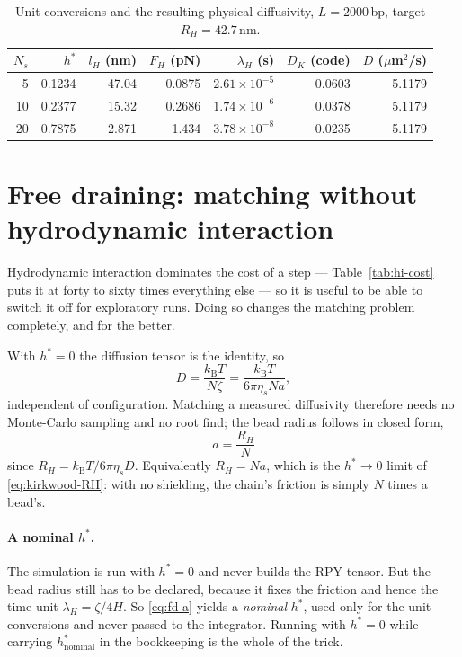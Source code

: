 \documentclass[11pt,a4paper]{report}
\newcommand{\kB}{k_\mathrm{B}}
\begin{document}
\begin{table}[ht]
\centering
\caption{Unit conversions and the resulting physical diffusivity, $L = 2000$\,bp,
target $R_H = 42.7$\,nm.}
\label{tab:real-units}
\begin{tabular}{@{}rrrrrrr@{}}
\toprule
$N_s$ & $h^{*}$ & $l_H$ (nm) & $F_H$ (pN) & $\lambda_H$ (s) & $D_K$ (code) & $D$ ($\mu$m$^2$/s) \\
\midrule
5  & 0.1234 & 47.04 & 0.0875 & $2.61\times10^{-5}$ & 0.0603 & 5.1179 \\
10 & 0.2377 & 15.32 & 0.2686 & $1.74\times10^{-6}$ & 0.0378 & 5.1179 \\
20 & 0.7875 & 2.871 & 1.434  & $3.78\times10^{-8}$ & 0.0235 & 5.1179 \\
\bottomrule
\end{tabular}
\end{table}



\section{Free draining: matching without hydrodynamic interaction}
\label{sec:free-draining}

Hydrodynamic interaction dominates the cost of a step --- Table~\ref{tab:hi-cost}
puts it at forty to sixty times everything else --- so it is useful to be able to
switch it off for exploratory runs. Doing so changes the matching problem
completely, and for the better.

With $h^{*} = 0$ the diffusion tensor is the identity, so
\begin{equation}
  D = \frac{\kB T}{N\zeta} = \frac{\kB T}{6\pi\eta_s N a},
\end{equation}
independent of configuration. Matching a measured diffusivity therefore needs no
Monte-Carlo sampling and no root find; the bead radius follows in closed form,
\begin{equation}
  \boxed{\; a = \frac{R_H}{N} \;}
  \label{eq:fd-a}
\end{equation}
since $R_H = \kB T/6\pi\eta_s D$. Equivalently $R_H = Na$, which is the
$h^{*}\to0$ limit of \eqref{eq:kirkwood-RH}: with no shielding, the chain's
friction is simply $N$ times a bead's.

\paragraph{A nominal $h^{*}$.} The simulation is run with $h^{*} = 0$ and never
builds the RPY tensor. But the bead radius still has to be declared, because it
fixes the friction and hence the time unit $\lambda_H = \zeta/4H$. So
\eqref{eq:fd-a} yields a \emph{nominal} $h^{*}$, used only for the unit
conversions and never passed to the integrator. Running with $h^{*} = 0$ while
carrying $h^{*}_{\mathrm{nominal}}$ in the bookkeeping is the whole of the trick.
\end{document}
